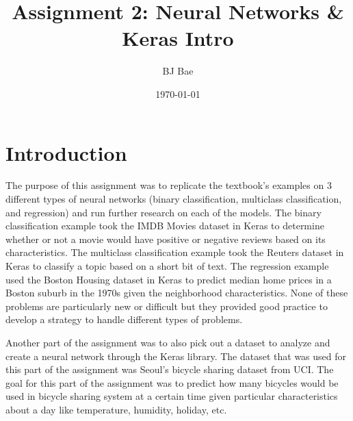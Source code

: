 \documentclass{article}
\title{Assignment 2: Neural Networks \& Keras Intro}
\author{BJ Bae}
\date{\today}
\begin{document}
\maketitle
\tableofcontents

\section{Introduction}
    The purpose of this assignment was to replicate the textbook's examples on 
    3 different types of neural networks (binary classification, 
    multiclass classification, and regression) and run further research on each 
    of the models. The binary classification example took the IMDB Movies dataset
    in Keras to determine whether or not a movie would have positive or negative reviews 
    based on its characteristics. The multiclass classification example took the Reuters dataset
    in Keras to classify a topic based on a short bit of text. The regression example used the 
    Boston Housing dataset in Keras to predict median home prices in a Boston suburb 
    in the 1970s given the neighborhood characteristics. None of these problems are particularly 
    new or difficult but they provided good practice to develop a strategy to handle 
    different types of problems.
    
    Another part of the assignment was to also pick out a dataset to analyze 
    and create a neural network through the Keras library. The dataset that was
    used for this part of the assignment was Seoul's bicycle sharing dataset from UCI.
    The goal for this part of the assignment was to predict how many bicycles would be used in 
    bicycle sharing system at a certain time given particular characteristics about a day like
    temperature, humidity, holiday, etc.
\end{document}
